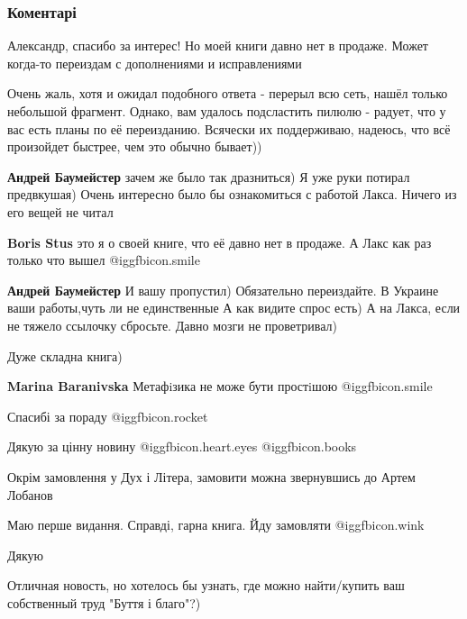  
 
 
 
 
\subsubsection{Коментарі}
\label{sec:15_11_2021.fb.baumejster_andrej.kiev.filosof.1.metafizika_kniga.cmt}

\begin{itemize} %
Александр, спасибо за интерес! Но моей книги давно нет в продаже. Может когда-то переиздам с дополнениями и исправлениями

\begin{itemize} %

Очень жаль, хотя и ожидал подобного ответа - перерыл всю сеть, нашёл только
небольшой фрагмент. Однако, вам удалось подсластить пилюлю - радует, что у вас
есть планы по её переизданию. Всячески их поддерживаю, надеюсь, что всё
произойдет быстрее, чем это обычно бывает))

\textbf{Андрей Баумейстер} зачем же было так дразниться)
Я уже руки потирал предвкушая)
Очень интересно было бы ознакомиться с работой Лакса.
Ничего из его вещей не читал

\textbf{Boris Stus} это я о своей книге, что её давно нет в продаже. А Лакс как раз только что вышел  @igg{fbicon.smile} 

\textbf{Андрей Баумейстер} И вашу пропустил)
Обязательно переиздайте.
В Украине ваши работы,чуть ли не единственные
А как видите спрос есть)
А на Лакса, если не тяжело ссылочку сбросьте. Давно мозги не проветривал)
\end{itemize} %

Дуже складна книга)

\textbf{Marina Baranivska} Метафiзика не може бути простiшою  @igg{fbicon.smile} 

Спасибі за пораду @igg{fbicon.rocket} 

Дякую за цінну новину @igg{fbicon.heart.eyes}  @igg{fbicon.books} 

Окрім замовлення у Дух і Літера, замовити можна звернувшись до Артем Лобанов

Маю перше видання. Справді, гарна книга. Йду замовляти @igg{fbicon.wink} 

Дякую

Отличная новость, но хотелось бы узнать, где можно найти/купить ваш собственный труд "Буття і благо"?)

\end{itemize} %

